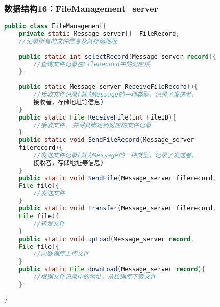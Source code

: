 \subsubsection{数据结构16：FileManagement\_server}
\begin{lstlisting}[language=Java, caption=文件管理类]
public class FileManagement{
    private static Message_server[]  FileRecord; 
    //记录所有的文件信息及其存储地址
    
    public static int selectRecord(Message_server record){
        //查询文件记录在FileRecord中的对应项
    }
    
    public static Message_server ReceiveFileRecord(){
        //接收文件记录(其为Message的一种类型，记录了发送者，
        接收者，存储地址等信息)
    }
    public static File ReceiveFile(int FileID){
        //接收文件, 并将其绑定到对应的文件记录
    }
    public static void SendFileRecord(Message_server 
    filerecord){
        //发送文件记录(其为Message的一种类型，记录了发送者，
        接收者，存储地址等信息)
    }
    public static void SendFile(Message_server filerecord,
    File file){
        //发送文件
    }
    public static void Transfer(Message_server filerecord,
    File file){
        //转发文件
    }
    public static void upLoad(Message_server record, 
    File file){
        //向数据库上传文件
    }
    public static File downLoad(Message_server record){
        //根据文件记录中的地址，从数据库下载文件
    }
    
}
\end{lstlisting}
